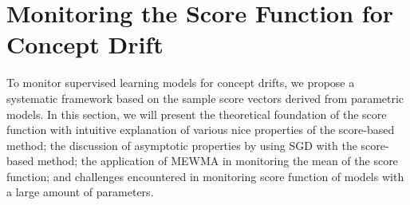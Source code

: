 \documentclass[twoside,11pt]{article}
\begin{document}
%
%
%

\section{Monitoring the Score Function for Concept Drift}
\label{s:theory_analysis_score}

To {monitor supervised learning models for} concept {drifts}, we propose a systematic framework based on the sample score vectors derived from parametric models. In this section, we will present the theoretical foundation of the score function with intuitive explanation of various nice properties of the score-based method; the discussion of asymptotic properties by using SGD with the score-based method; the application of MEWMA in monitoring the mean of the score function; and challenges encountered in monitoring score function of models with a large amount of parameters.
\end{document}
